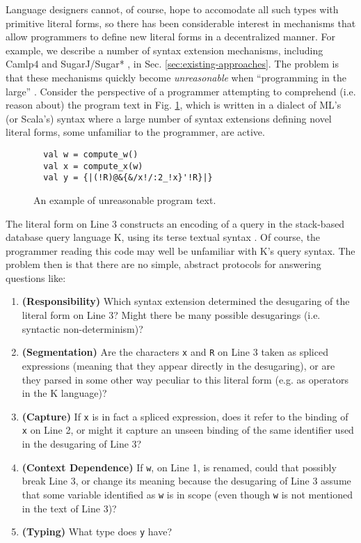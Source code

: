 \documentclass[acmsmall,10pt,review,anonymous]{acmart}\settopmatter{printfolios=true}
\newcommand{\li}[1]{\lstinline{#1}}
\begin{document}
Language designers cannot, of course, hope to accomodate all such types with primitive literal forms, so there has been considerable interest in mechanisms that allow programmers to define new literal forms in a decentralized manner. For example, we describe a number of syntax extension mechanisms, including Camlp4 \cite{ocaml-manual} and SugarJ/Sugar* \cite{erdweg2011sugarj,erdweg2013framework}, in Sec. \ref{sec:existing-approaches}. The problem is that these mechanisms quickly become \emph{unreasonable} when ``programming in the large'' \cite{DeRemer76}.
Consider the perspective of a programmer attempting to comprehend (i.e. reason about) the program text in Fig. \ref{fig:K-dialect}, which is written in a dialect of ML's (or Scala's) syntax where a large number of syntax extensions defining novel literal forms, some unfamiliar to the programmer, are active.

\begin{figure}[h]
\vspace{-10px}
\begin{lstlisting}
  val w = compute_w()
  val x = compute_x(w)
  val y = {|(!R)@&{&/x!/:2_!x}'!R}|}
\end{lstlisting}
\vspace{-10px}
\caption{An example of unreasonable program text.}
\vspace{-9px}
\label{fig:K-dialect}
\end{figure}

\noindent
The literal form on Line 3 constructs an encoding of a query in the stack-based database query language K, using its terse textual syntax \cite{Whitney:2001:LOR:376284.375783}. Of course, the programmer reading this code may well be unfamiliar with K's query syntax. The problem then is that there are no simple, abstract protocols for answering questions like:

\begin{enumerate}
\item \textbf{(Responsibility)} Which syntax extension determined the desugaring of the literal form on Line 3? Might there be many possible desugarings (i.e. syntactic non-determinism)?
\item \textbf{(Segmentation)} Are the characters \li{x} and \li{R} on Line 3 taken as spliced expressions (meaning that they appear directly in the desugaring), or are they parsed in some other way peculiar to this literal form (e.g. as operators in the K language)?
\item \textbf{(Capture)} If \li{x} is in fact a spliced expression, does it refer to the binding of \li{x} on Line 2, or might it capture an unseen binding of the same identifier used in the desugaring of Line 3?
\item \textbf{(Context Dependence)} If \li{w}, on Line 1, is renamed, could that possibly break Line 3, or change its meaning because the desugaring of Line 3 assume that some variable identified as \li{w} is in scope (even though \li{w} is not mentioned in the text of Line 3)?
\item \textbf{(Typing)} What type does \li{y} have?
\end{enumerate}
\end{document}
